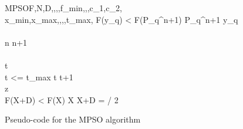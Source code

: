 \begin{pseudocode}{MPSO}{F,N,D,,,,f_{min},,\chi,c_1,c_2,\\
												x_{min},x_{max},,\epsilon,\lambda,t_{max},}
			\IF F(y_q) < F(P_{q}^{n+1}) \THEN P_{q}^{n+1} \GETS y_q
		\END \\
	\END \\
	n \GETS n+1
\END
\ENDMAIN \\
\\
t \\
\WHILE t <= t_{max} \DO
\BEGIN
	t \GETS t+1\\
	z \GETS {}\\
	\IF F(X+\lambda*D) < F(X) \THEN X \GETS X+\lambda*D
	\ELSE \lambda = \lambda / 2
\END \\
\ENDPROCEDURE
\end{pseudocode}

\vspace*{-1cm}
\begin{center}
Pseudo-code for the MPSO algorithm
\end{center}